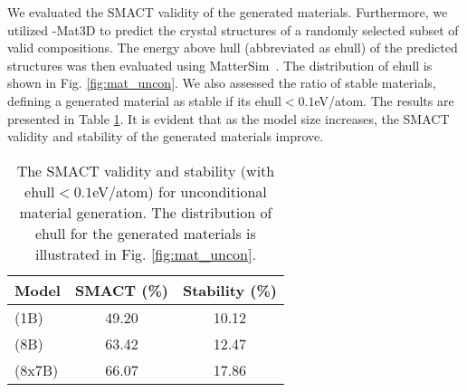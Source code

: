 We evaluated the SMACT validity of the generated materials. %
Furthermore, we utilized \ourM{}-Mat3D to predict the crystal structures of a randomly selected subset of valid compositions. 
The energy above hull (abbreviated as ehull) of the predicted structures was then evaluated using MatterSim~\cite{yang2024mattersim}.
The distribution of ehull is shown in Fig. \ref{fig:mat_uncon}. We also assessed the ratio of stable materials, defining a generated material as stable if its ehull$<0.1$eV/atom. The results are presented in Table \ref{tab:uncon_mat}. It is evident that as the model size increases, the SMACT validity and stability of the generated materials improve.
\begin{table}[!htbp]
    \centering
    \begin{tabular}{lcc}
        \toprule
        Model & SMACT (\%) & Stability (\%) \\
        \midrule
        \ourM{} (1B) & 49.20 & 10.12\\ %
        \ourM{} (8B) & 63.42 & 12.47\\ %
        \ourM{} (8x7B) & 66.07 & 17.86\\%
        \bottomrule
    \end{tabular}
    \caption{The SMACT validity and stability (with ehull$<0.1$eV/atom) for unconditional material generation. The distribution of ehull for the generated materials is illustrated in Fig. \ref{fig:mat_uncon}.}
    \label{tab:uncon_mat}
\end{table}


